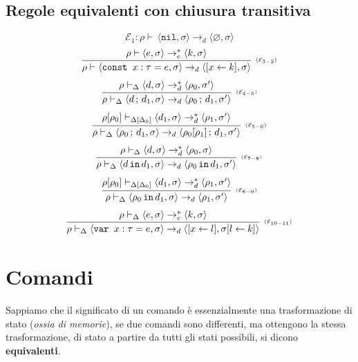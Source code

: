 \documentclass[oneside,a4paper,11pt]{book}
\theoremstyle{italicstyle}
\theoremstyle{normStyle}
\begin{document}
\subsection{Regole equivalenti con chiusura transitiva}
\[
  \mathcal{E}_1: \rho \vdash\, \langle \texttt{nil}, \sigma \rangle \rightarrow_d \langle \varnothing, \sigma \rangle
\]
\[
    \infer[\scriptscriptstyle (\mathcal{E}_{3-2})]
    {
      \rho \vdash \langle \texttt{const }x:\tau=e,\sigma \rangle \rightarrow_d \langle [x \leftarrow k],\sigma \rangle
    }
    {
      \rho \vdash \langle e , \sigma \rangle \rightarrow_e^* \langle k, \sigma \rangle
    }
\]
\[
    \infer[\scriptscriptstyle (\mathcal{E}_{4-5})]
    {
      \rho \vdash_\Delta  \langle d\,; \,d_1, \sigma \rangle \rightarrow_d \langle \rho_0\,; \,d_1, \sigma' \rangle
    }
    {
      \rho \vdash_\Delta \langle d , \sigma \rangle \rightarrow_d^* \langle \rho_0, \sigma' \rangle
    }
\]
\[
    \infer[\scriptscriptstyle (\mathcal{E}_{5-6})]
    {
      \rho \vdash_\Delta  \langle \rho_0\,; \,d_1, \sigma \rangle \rightarrow_d \langle \rho_0[\rho_1]\,; \,d_1, \sigma' \rangle
    }
    {
      \rho[\rho_0] \vdash_{\Delta[\Delta_0]} \langle d_1 , \sigma \rangle \rightarrow_d^* \langle \rho_1, \sigma' \rangle
    }
\]
\[
    \infer[\scriptscriptstyle (\mathcal{E}_{7-8})]
    {
      \rho \vdash_\Delta  \langle d\,\texttt{in}\,d_1, \sigma \rangle \rightarrow_d \langle \rho_0\,\texttt{in}\,d_1, \sigma' \rangle
    }
    {
      \rho \vdash_\Delta \langle d , \sigma \rangle \rightarrow_d^* \langle \rho_0, \sigma \rangle
    }
\]
\[
    \infer[\scriptscriptstyle (\mathcal{E}_{8-9})]
    {
      \rho \vdash_\Delta  \langle \rho_0\,\texttt{in} \,d_1, \sigma \rangle \rightarrow_d \langle \rho_1, \sigma' \rangle
    }
    {
      \rho[\rho_0] \vdash_{\Delta[\Delta_0]} \langle d_1 , \sigma \rangle \rightarrow_d^* \langle \rho_1, \sigma' \rangle
    }
\]
\[
    \infer[\scriptscriptstyle (\mathcal{E}_{10-11})]
    {
      \rho \vdash_\Delta \langle \texttt{var }x:\tau=e,\sigma\rangle \rightarrow_d \langle [x \leftarrow l],\sigma[l \leftarrow k]\rangle
    }
    {
      \rho \vdash_\Delta \langle e , \sigma \rangle \rightarrow_e^* \langle k, \sigma \rangle
    }
\]
\section{Comandi}
Sappiamo che il significato di un comando è essenzialmente una trasformazione 
di stato (\textit{ossia di memorie}), se due comandi sono differenti, ma ottengono la stessa trasformazione,
di stato a partire da tutti gli stati possibili, si dicono \textbf{equivalenti}.
\end{document}
